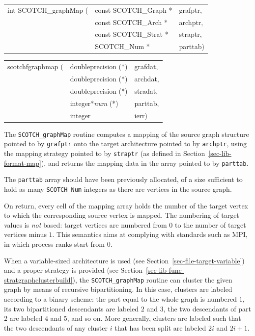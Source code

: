 \begin{itemize}
\progsyn

{\tt\begin{tabular}{l@{}ll}
int SCOTCH\_graphMap ( & const SCOTCH\_Graph * & grafptr, \\
                       & const SCOTCH\_Arch *  & archptr, \\
                       & const SCOTCH\_Strat * & straptr, \\
                       & SCOTCH\_Num *         & parttab)
\end{tabular}}

{\tt\begin{tabular}{l@{}ll}
scotchfgraphmap ( & doubleprecision (*)   & grafdat, \\
                  & doubleprecision (*)   & archdat, \\
                  & doubleprecision (*)   & stradat, \\
                  & integer*{\it num} (*) & parttab, \\
                  & integer               & ierr)
\end{tabular}}

\progdes

The {\tt SCOTCH\_graphMap} routine computes a mapping of the source
graph structure pointed to by {\tt grafptr} onto the target
architecture pointed to by {\tt archptr}, using the mapping strategy
pointed to by {\tt straptr} (as defined in
Section~\ref{sec-lib-format-map}), and returns the mapping data in the
array pointed to by {\tt parttab}.

The {\tt parttab} array should have been previously allocated, of a
size sufficient to hold as many {\tt SCOTCH\_\lbt Num} integers as
there are vertices in the source graph.

On return, every cell of the mapping array holds the number of the
target vertex to which the corresponding source vertex is mapped.
The numbering of target values is {\em not\/} based: target vertices
are numbered from $0$ to the number of target vertices minus $1$.
This semantics aims at complying with standards such as MPI, in
which process ranks start from $0$.

When a variable-sized architecture is used (see
Section~\ref{sec-file-target-variable}) and a proper strategy is
provided (see Section~\ref{sec-lib-func-stratgraphclusterbuild}),
the {\tt SCOTCH\_graph\lbt Map} routine can cluster
the given graph by means of recursive bipartitioning.
In this case, clusters are labeled according to a binary scheme: the
part equal to the whole graph is numbered $1$, its two bipartitioned
descendants are labeled $2$ and $3$, the two descendants of part $2$
are labeled $4$ and $5$, and so on. More generally, clusters are
labeled such that the two descendants of any cluster $i$ that has been
split are labeled $2i$ and $2i + 1$.


\end{itemize}
